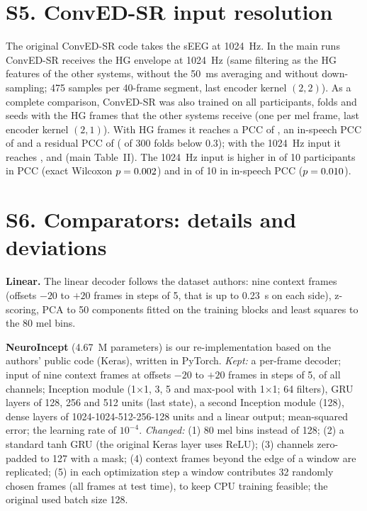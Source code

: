 \documentclass[10pt,a4paper]{article}
\begin{document}
\section*{S5. ConvED-SR input resolution}

The original ConvED-SR code takes the sEEG at 1024~Hz. In the main runs ConvED-SR receives the HG envelope at 1024~Hz (same filtering as the HG features of the other systems, without the 50~ms averaging and without down-sampling; 475 samples per 40-frame segment, last encoder kernel $(2,2)$). As a complete comparison, ConvED-SR was also trained on all participants, folds and seeds with the HG frames that the other systems receive (one per mel frame, last encoder kernel $(2,1)$). With HG frames it reaches a PCC of \NCHgPcc{}, an in-speech PCC of \NCHgIns{} and a residual PCC of \NCHgRes{} (\NCHgLow{} of 300 folds below 0.3); with the 1024~Hz input it reaches \NBConPcc{}, \NBConIns{} and \NBConRes{} (main Table~II). The 1024~Hz input is higher in \NCKvsHgPccWin{} of 10 participants in PCC (exact Wilcoxon $p=0.002$) and in \NCKvsHgInsWin{} of 10 in in-speech PCC ($p=0.010$).

\section*{S6. Comparators: details and deviations}

\textbf{Linear.} The linear decoder follows the dataset authors: nine context frames (offsets $-20$ to $+20$ frames in steps of 5, that is up to 0.23~s on each side), z-scoring, PCA to 50 components fitted on the training blocks and least squares to the 80 mel bins.

\textbf{NeuroIncept} (4.67~M parameters) is our re-implementation based on the authors' public code (Keras), written in PyTorch. \emph{Kept:} a per-frame decoder; input of nine context frames at offsets $-20$ to $+20$ frames in steps of 5, of all channels; Inception module (1$\times$1, 3, 5 and max-pool with 1$\times$1; 64 filters), GRU layers of 128, 256 and 512 units (last state), a second Inception module (128), dense layers of 1024-1024-512-256-128 units and a linear output; mean-squared error; the learning rate of $10^{-4}$. \emph{Changed:} (1) 80 mel bins instead of 128; (2) a standard tanh GRU (the original Keras layer uses ReLU); (3) channels zero-padded to 127 with a mask; (4) context frames beyond the edge of a window are replicated; (5) in each optimization step a window contributes 32 randomly chosen frames (all frames at test time), to keep CPU training feasible; the original used batch size 128.
\end{document}
